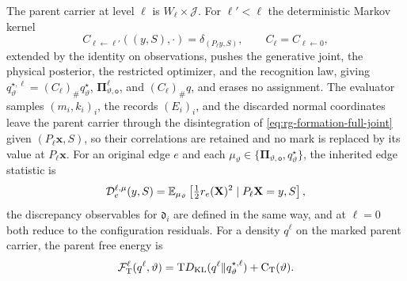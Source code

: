 The parent carrier at level \(\ell\) is \(W_\ell\times\mathcal J\). For
\(\ell'<\ell\) the deterministic Markov kernel
\begin{equation}
C_{\ell\leftarrow\ell'}((y,S),\cdot)=\delta_{(P_\ell y,S)},
\qquad C_\ell=C_{\ell\leftarrow0},
\label{eq:rg-formation-marked-channel}
\end{equation}
extended by the identity on observations, pushes the generative joint, the
physical posterior, the restricted optimizer, and the recognition law, giving
\(q^{\star,\ell}_\vartheta=(C_\ell)_\#q^\star_\vartheta\),
\(\boldsymbol\Pi^\ell_{\vartheta,\mathsf o}\), and \((C_\ell)_\#q\), and
erases no assignment. The evaluator samples \((m_i,k_i)_i\), the records
\((E_i)_i\), and the discarded normal coordinates leave the parent carrier
through the disintegration of \cref{eq:rg-formation-full-joint} given
\((P_\ell\mathbf x,S)\), so their correlations are retained and no mark is
replaced by its value at \(P_\ell\mathbf x\). For an original edge
\(e\) and each \(\mu_\vartheta\in
\{\boldsymbol\Pi_{\vartheta,\mathsf o},q^\star_\vartheta\}\), the inherited
edge statistic is
\begin{equation}
\mathcal D_e^{\ell,\mu}(y,S)
=\mathbb E_{\mu_\vartheta}
 \left[\tfrac12r_e(\mathbf X)^2\mid P_\ell\mathbf X=y,S\right],
\label{eq:rg-formation-inherited-edge-statistic}
\end{equation}
the discrepancy observables for \(\mathfrak d_i\) are defined in the same way,
and at \(\ell=0\) both reduce to the configuration residuals. For a density
\(q^\ell\) on the marked parent carrier, the parent free energy is
\begin{equation}
\mathcal F^\ell_{\mathrm T}(q^\ell,\vartheta)
  =\mathrm TD_{\mathrm{KL}}(q^\ell\Vert q^{\star,\ell}_\vartheta)+\mathrm C_{\mathrm T}(\vartheta).
\label{eq:rg-formation-parent-vfe}
\end{equation}

